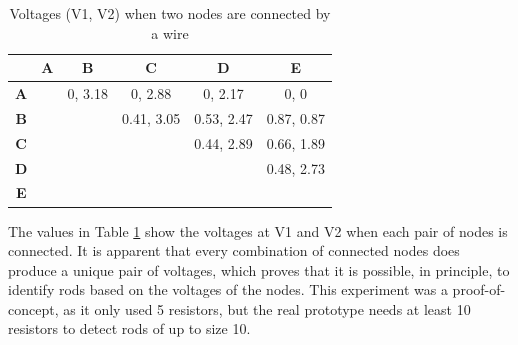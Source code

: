 \begin{table}[H]
\centering
\begin{tabular}{c|ccccc}
\cline{2-6}
                                 & \multicolumn{1}{c|}{\textbf{A}}                 & \multicolumn{1}{c|}{\textbf{B}}                 & \multicolumn{1}{c|}{\textbf{C}}                 & \multicolumn{1}{c|}{\textbf{D}}                 & \multicolumn{1}{c|}{\textbf{E}}                 \\ \hline
\multicolumn{1}{|c|}{\textbf{A}} & \multicolumn{1}{c|}{\cellcolor[HTML]{C0C0C0}}   & \multicolumn{1}{c|}{0, 3.18}                    & \multicolumn{1}{c|}{0, 2.88}                    & \multicolumn{1}{c|}{0, 2.17}                    & \multicolumn{1}{c|}{0, 0}                       \\ \cline{1-1} \cline{3-6} 
\multicolumn{1}{|c|}{\textbf{B}} & \cellcolor[HTML]{C0C0C0}                        & \multicolumn{1}{c|}{\cellcolor[HTML]{C0C0C0}}   & \multicolumn{1}{c|}{0.41, 3.05}                 & \multicolumn{1}{c|}{0.53, 2.47}                 & \multicolumn{1}{c|}{0.87, 0.87}                 \\ \cline{1-1} \cline{4-6} 
\multicolumn{1}{|c|}{\textbf{C}} & \cellcolor[HTML]{C0C0C0}                        & \cellcolor[HTML]{C0C0C0}                        & \multicolumn{1}{c|}{\cellcolor[HTML]{C0C0C0}}   & \multicolumn{1}{c|}{0.44, 2.89}                 & \multicolumn{1}{c|}{0.66, 1.89}                 \\ \cline{1-1} \cline{5-6} 
\multicolumn{1}{|c|}{\textbf{D}} & \cellcolor[HTML]{C0C0C0}                        & \cellcolor[HTML]{C0C0C0}                        & \cellcolor[HTML]{C0C0C0}                        & \multicolumn{1}{c|}{\cellcolor[HTML]{C0C0C0}}   & \multicolumn{1}{c|}{0.48, 2.73}                 \\ \cline{1-1} \cline{6-6} 
\multicolumn{1}{|c|}{\textbf{E}} & \cellcolor[HTML]{C0C0C0}{\color[HTML]{333333} } & \cellcolor[HTML]{C0C0C0}{\color[HTML]{333333} } & \cellcolor[HTML]{C0C0C0}{\color[HTML]{333333} } & \cellcolor[HTML]{C0C0C0}{\color[HTML]{333333} } & \cellcolor[HTML]{C0C0C0}{\color[HTML]{333333} } \\ \cline{1-1}
\end{tabular}
\caption{Voltages (V1, V2) when two nodes are connected by a wire}
\label{tab:5r_voltages}
\end{table}

The values in Table \ref{tab:5r_voltages} show the voltages at V1 and V2 when each pair of nodes is connected. It is apparent that every combination of connected nodes does produce a unique pair of voltages, which proves that it is possible, in principle, to identify rods based on the voltages of the nodes. This experiment was a proof-of-concept, as it only used 5 resistors, but the real prototype needs at least 10 resistors to detect rods of up to size 10.

